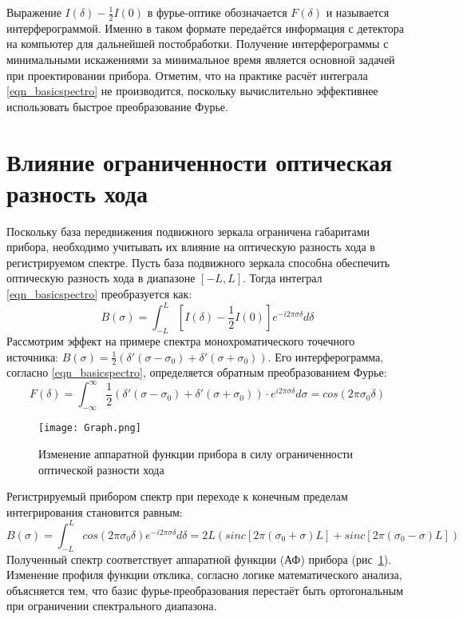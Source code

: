 \documentclass{mipt-thesis-bs}
\begin{document}
	Выражение $I(\delta)-\frac{1}{2} I(0)$ в фурье-оптике обозначается $F(\delta)$ и называется интерферограммой. Именно в таком формате передаётся информация с детектора на компьютер для дальнейшей постобработки. Получение интерферограммы с минимальными искажениями за минимальное время является основной задачей при проектировании прибора.
	Отметим, что на практике расчёт интеграла \eqref{eqn_basicspectro} не производится, поскольку вычислительно эффективнее использовать быстрое преобразование Фурье. 
	
\section{Влияние ограниченности оптическая разность хода}

Поскольку база передвижения подвижного зеркала ограничена габаритами прибора, необходимо учитывать их влияние на оптическую разность  хода в регистрируемом спектре. Пусть база подвижного зеркала способна обеспечить оптическую разность хода в диапазоне $[-L,L]$. Тогда интеграл \eqref{eqn_basicspectro} преобразуется как: 
	\begin{equation}
	B(\sigma)= \int^{L}_{-L} \left[ I(\delta)-\frac{1}{2} I(0)\right] e^{-i2\pi\sigma\delta} d\delta
	\label{eqn_basicspectromod}
\end{equation}
Рассмотрим эффект на примере спектра монохроматического точечного источника: $B(\sigma)=\frac{1}{2}\left(\delta'(\sigma-\sigma_0)+\delta'(\sigma+\sigma_0)\right)$. Его интерферограмма, согласно \eqref{eqn_basicspectro}, определяется обратным преобразованием Фурье:
 $$F(\delta)=\int^\infty_{-\infty} \frac{1}{2}\left(\delta'(\sigma-\sigma_0)+\delta'(\sigma+\sigma_0)\right)\cdot e^{i2\pi\sigma\delta} d\sigma= cos(2\pi\sigma_0\delta)$$
 
 \begin{figure}[h]
 	\centering
 	\texttt{[image: Graph.png]}
 	\caption{Изменение аппаратной функции прибора в силу ограниченности оптической разности хода}
 	\label{fig_instrumentlimits}
 \end{figure}
 
Регистрируемый прибором спектр при переходе к конечным пределам интегрирования становится равным:
\begin{equation}
 B(\sigma)=\int^L_{-L} cos(2\pi\sigma_0\delta) e^{-i2\pi\sigma\delta} d\delta = 2L \left( sinc\left[2\pi(\sigma_0+\sigma)L\right]+sinc\left[2\pi(\sigma_0-\sigma)L\right] \right)
\end{equation}
Полученный спектр соответствует аппаратной функции (АФ) прибора (рис~\ref{fig_instrumentlimits}). Изменение профиля функции отклика, согласно логике математического анализа, объясняется тем, что базис фурье-преобразования перестаёт быть ортогональным при ограничении спектрального диапазона.
\end{document}
